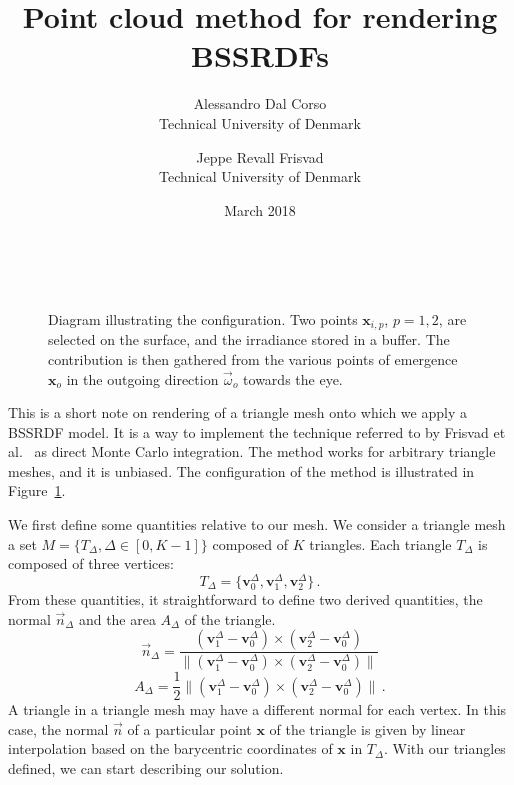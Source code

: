 \documentclass[10pt,a4paper]{article}
\title{Point cloud method for rendering BSSRDFs}
\date{March 2018}
\author{ Alessandro Dal Corso \\ Technical University of Denmark \and Jeppe Revall Frisvad \\ Technical University of Denmark
}
\begin{document}
\maketitle
\vspace{-1em}
\begin{figure}
\centering
   \def\svgwidth{0.8\textwidth}
    \\
\caption{Diagram illustrating the configuration. Two points $\mathbf{x}_{i,p}$, $p=1,2$, are selected on the surface, and the irradiance stored in a buffer. The contribution is then gathered from the various points of emergence $\mathbf{x}_o$ in the outgoing direction $\vec{\omega}_o$ towards the eye.}
\label{fig:vpt}
\end{figure}

\noindent This is a short note on rendering of a triangle mesh onto which we apply a BSSRDF model. It is a way to implement the technique referred to by Frisvad et al.~\cite{frisvad14directional} as direct Monte Carlo integration. The method works for arbitrary triangle meshes, and it is unbiased. The configuration of the method is illustrated in Figure~\ref{fig:vpt}.

We first define some quantities relative to our mesh. We consider a triangle mesh a set $M = \{T_\Delta, \Delta \in [0, K - 1] \}$ composed of $K$ triangles. Each triangle $T_\Delta$ is composed of three vertices:
\begin{equation*}
T_\Delta = \{ \mathbf{v}^\Delta_0, \mathbf{v}^\Delta_1, \mathbf{v}^\Delta_2 \} \, .
\end{equation*}
From these quantities, it straightforward to define two derived quantities, the normal $\vec{n}_\Delta$ and the area $A_\Delta$ of the triangle.
\begin{equation*}
\vec{n}_\Delta = \frac{(\mathbf{v}^\Delta_1 - \mathbf{v}^\Delta_0) \times (\mathbf{v}^\Delta_2 - \mathbf{v}^\Delta_0) }{ \|(\mathbf{v}^\Delta_1 - \mathbf{v}^\Delta_0) \times (\mathbf{v}^\Delta_2 - \mathbf{v}^\Delta_0)  \|}
\end{equation*}
\begin{equation*}
A_\Delta = \frac{1}{2} \|(\mathbf{v}^\Delta_1 - \mathbf{v}^\Delta_0) \times (\mathbf{v}^\Delta_2 - \mathbf{v}^\Delta_0) \| \, .
\end{equation*}
A triangle in a triangle mesh may have a different normal for each vertex. In this case, the normal $\vec{n}$ of a particular point $\mathbf{x}$ of the triangle is given by linear interpolation based on the barycentric coordinates of $\mathbf{x}$ in $T_\Delta$. With our triangles defined, we can start describing our solution.
\end{document}
